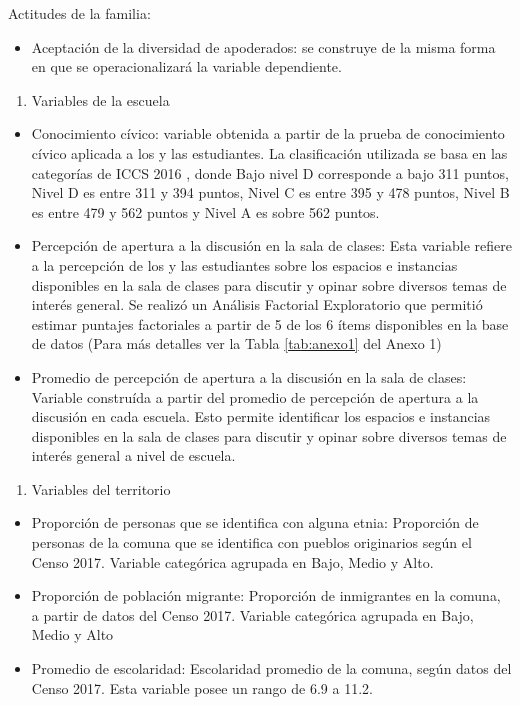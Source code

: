 \documentclass[12pt,twoside]{templates/facsothesis}
\providecommand{\tightlist}{%
  \setlength{\itemsep}{0pt}\setlength{\parskip}{0pt}}
\begin{document}
Actitudes de la familia:

\begin{itemize}
\tightlist
\item
  Aceptación de la diversidad de apoderados: se construye de la misma forma en que se operacionalizará la variable dependiente.
\end{itemize}

\begin{enumerate}
\def\labelenumi{\arabic{enumi})}
\setcounter{enumi}{1}
\tightlist
\item
  Variables de la escuela
\end{enumerate}

\begin{itemize}
\item
  Conocimiento cívico: variable obtenida a partir de la prueba de conocimiento cívico aplicada a los y las estudiantes. La clasificación utilizada se basa en las categorías de ICCS 2016 \citep{agenciacalidaddelaeducacion_informe_2018}, donde Bajo nivel D corresponde a bajo 311 puntos, Nivel D es entre 311 y 394 puntos, Nivel C es entre 395 y 478 puntos, Nivel B es entre 479 y 562 puntos y Nivel A es sobre 562 puntos.
\item
  Percepción de apertura a la discusión en la sala de clases: Esta variable refiere a la percepción de los y las estudiantes sobre los espacios e instancias disponibles en la sala de clases para discutir y opinar sobre diversos temas de interés general. Se realizó un Análisis Factorial Exploratorio que permitió estimar puntajes factoriales a partir de 5 de los 6 ítems disponibles en la base de datos (Para más detalles ver la Tabla \ref{tab:anexo1} del Anexo 1)
\item
  Promedio de percepción de apertura a la discusión en la sala de clases: Variable construída a partir del promedio de percepción de apertura a la discusión en cada escuela. Esto permite identificar los espacios e instancias disponibles en la sala de clases para discutir y opinar sobre diversos temas de interés general a nivel de escuela.
\end{itemize}

\begin{enumerate}
\def\labelenumi{\arabic{enumi})}
\setcounter{enumi}{2}
\tightlist
\item
  Variables del territorio
\end{enumerate}

\begin{itemize}
\item
  Proporción de personas que se identifica con alguna etnia: Proporción de personas de la comuna que se identifica con pueblos originarios según el Censo 2017. Variable categórica agrupada en Bajo, Medio y Alto.
\item
  Proporción de población migrante: Proporción de inmigrantes en la comuna, a partir de datos del Censo 2017. Variable categórica agrupada en Bajo, Medio y Alto
\item
  Promedio de escolaridad: Escolaridad promedio de la comuna, según datos del Censo 2017. Esta variable posee un rango de 6.9 a 11.2.
\end{itemize}
\end{document}
